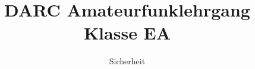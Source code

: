 \documentclass[aspectratio = 169]{beamer}
\begin{document}
\title{DARC Amateurfunklehrgang Klasse EA}
\author{Sicherheit}
\begin{frame}
\maketitle
\end{frame}









\end{document}
